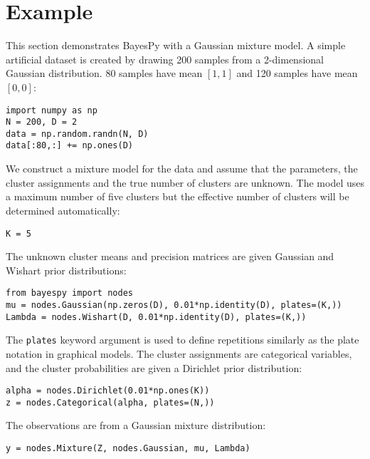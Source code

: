 \documentclass[twoside,11pt]{article}
\begin{document}










\section{Example}

This section demonstrates BayesPy with a Gaussian mixture model.  A simple
artificial dataset is created by drawing 200 samples from a 2-dimensional
Gaussian distribution.  80 samples have mean $[1, 1]$ and 120 samples have mean
$[0, 0]$:
\begin{lstlisting}
import numpy as np
N = 200, D = 2
data = np.random.randn(N, D)
data[:80,:] += np.ones(D)
\end{lstlisting}
We construct a mixture model for the data and assume that the parameters, the
cluster assignments and the true number of clusters are unknown.  The model uses
a maximum number of five clusters but the effective number of clusters will be
determined automatically:
\begin{lstlisting}
K = 5
\end{lstlisting}
The unknown cluster means and precision matrices are given Gaussian and Wishart
prior distributions:
\begin{lstlisting}
from bayespy import nodes
mu = nodes.Gaussian(np.zeros(D), 0.01*np.identity(D), plates=(K,))
Lambda = nodes.Wishart(D, 0.01*np.identity(D), plates=(K,))
\end{lstlisting}
The \texttt{plates} keyword argument is used to define repetitions similarly as
the plate notation in graphical models.  The cluster assignments are categorical
variables, and the cluster probabilities are given a Dirichlet prior
distribution:
\begin{lstlisting}
alpha = nodes.Dirichlet(0.01*np.ones(K))
z = nodes.Categorical(alpha, plates=(N,))
\end{lstlisting}
The observations are from a Gaussian mixture distribution:
\begin{lstlisting}
y = nodes.Mixture(Z, nodes.Gaussian, mu, Lambda)
\end{lstlisting}
\end{document}
